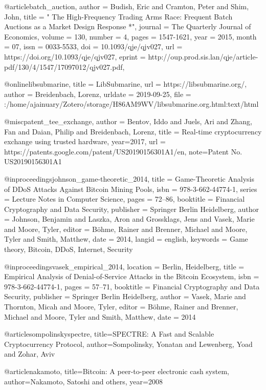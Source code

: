 @article{batch_auction,
    author = {Budish, Eric and Cramton, Peter and Shim, John},
    title = "{ The High-Frequency Trading Arms Race: Frequent Batch Auctions as a Market Design Response *}",
    journal = {The Quarterly Journal of Economics},
    volume = {130},
    number = {4},
    pages = {1547-1621},
    year = {2015},
    month = {07},
    issn = {0033-5533},
    doi = {10.1093/qje/qjv027},
    url = {https://doi.org/10.1093/qje/qjv027},
    eprint = {http://oup.prod.sis.lan/qje/article-pdf/130/4/1547/17097012/qjv027.pdf},
}

@online{libsubmarine,
	title = {{LibSubmarine}},
	url = {https://libsubmarine.org/},
	author = {Breidenbach, Lorenz},
	urldate = {2019-09-25},
	file = {:/home/ajainuary/Zotero/storage/H86AM9WV/libsubmarine.org.html:text/html}
}

@misc{patent_tee_exchange,
    author = {Bentov, Iddo and Juels, Ari and Zhang, Fan and Daian, Philip and Breidenbach, Lorenz},
    title = {Real-time cryptocurrency exchange using trusted hardware},
    year={2017},
    url = {https://patents.google.com/patent/US20190156301A1/en},
    note={Patent No. US20190156301A1}
}

@inproceedings{johnson_game-theoretic_2014,
	title = {Game-Theoretic Analysis of {DDoS} Attacks Against Bitcoin Mining Pools},
	isbn = {978-3-662-44774-1},
	series = {Lecture Notes in Computer Science},
	pages = {72--86},
	booktitle = {Financial Cryptography and Data Security},
	publisher = {Springer Berlin Heidelberg},
	author = {Johnson, Benjamin and Laszka, Aron and Grossklags, Jens and Vasek, Marie and Moore, Tyler},
	editor = {Böhme, Rainer and Brenner, Michael and Moore, Tyler and Smith, Matthew},
	date = {2014},
	langid = {english},
	keywords = {Game theory, Bitcoin, {DDoS}, Internet, Security}
}


@inproceedings{vasek_empirical_2014,
	location = {Berlin, Heidelberg},
	title = {Empirical Analysis of Denial-of-Service Attacks in the Bitcoin Ecosystem},
	isbn = {978-3-662-44774-1},
	pages = {57--71},
	booktitle = {Financial Cryptography and Data Security},
	publisher = {Springer Berlin Heidelberg},
	author = {Vasek, Marie and Thornton, Micah and Moore, Tyler},
	editor = {Böhme, Rainer and Brenner, Michael and Moore, Tyler and Smith, Matthew},
	date = {2014}
}

@article{sompolinskyspectre,
  title={SPECTRE: A Fast and Scalable Cryptocurrency Protocol},
  author={Sompolinsky, Yonatan and Lewenberg, Yoad and Zohar, Aviv}
}

@article{nakamoto,
  title={Bitcoin: A peer-to-peer electronic cash system},
  author={Nakamoto, Satoshi and others},
  year={2008}
}

